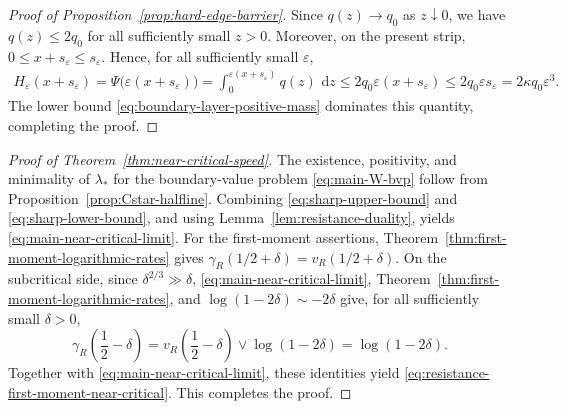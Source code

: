 \documentclass[a4paper,fleqn]{cas-sc}
\newif\ifshowrevisions
\DeclareRobustCommand{\rev}[1]{{\ifshowrevisions\color{blue}\fi#1}}
\numberwithin{equation}{section}
\theoremstyle{plain}
\theoremstyle{definition}
\newcommand{\dd}{\,\mathrm d}
\begin{document}
\begin{proof}[Proof of Proposition~\ref{prop:hard-edge-barrier}]
Since $q(z)\to q_0$ as $z\downarrow0$, we have
$q(z)\le2q_0$ for all sufficiently small $z>0$.  Moreover, on the
present strip, $0\le x+s_\varepsilon\le s_\varepsilon$.  Hence, for all
sufficiently small $\varepsilon$,
\[
\begin{aligned}
 H_\varepsilon(x+s_\varepsilon)
 =\Psi\bigl(\varepsilon(x+s_\varepsilon)\bigr)
 =\int_0^{\varepsilon(x+s_\varepsilon)}q(z)\,\dd z
 \le2q_0\varepsilon(x+s_\varepsilon)
 \le2q_0\varepsilon s_\varepsilon
 =2\kappa q_0\varepsilon^3.
\end{aligned}
\]
  The lower bound
\eqref{eq:boundary-layer-positive-mass} dominates this quantity, completing
the proof.
\end{proof}


\begin{proof}[Proof of Theorem~\ref{thm:near-critical-speed}]
The existence, positivity, and minimality of $\lambda_*$ for the
boundary-value problem \eqref{eq:main-W-bvp} follow from
Proposition~\ref{prop:Cstar-halfline}.
  \rev{Combining \eqref{eq:sharp-upper-bound} and
\eqref{eq:sharp-lower-bound}, and using
Lemma~\ref{lem:resistance-duality}, yields
\eqref{eq:main-near-critical-limit}.}
For the first-moment assertions, Theorem~\ref{thm:first-moment-logarithmic-rates}
gives
$\gamma_R(1/2+\delta)=v_R(1/2+\delta)$.  On the subcritical side, since
$\delta^{2/3}\gg\delta$, \eqref{eq:main-near-critical-limit},
Theorem~\ref{thm:first-moment-logarithmic-rates}, and
$\log(1-2\delta)\sim-2\delta$ give, for all sufficiently small $\delta>0$,
\[
 \gamma_R\left(\frac12-\delta\right)
 =v_R\left(\frac12-\delta\right)\vee\log(1-2\delta)
 =\log(1-2\delta).
\]
Together with \eqref{eq:main-near-critical-limit}, these identities yield
\eqref{eq:resistance-first-moment-near-critical}.  This completes the proof.
\end{proof}
\end{document}
